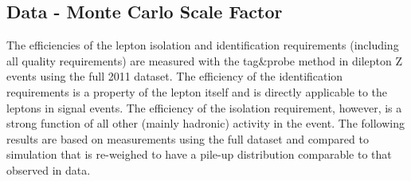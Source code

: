 \subsection{Data - Monte Carlo Scale Factor}
\label{sec:tnp}

The efficiencies of the lepton isolation and identification requirements (including all quality requirements) 
are measured with the tag\&probe method in dilepton Z events using the full 2011 dataset.
The efficiency of the identification requirements is a property of the lepton itself and is directly applicable
 to the leptons in signal events.
The efficiency of the isolation requirement, however, is a strong function of all other (mainly hadronic)
activity in the event.
The following results are based on measurements using the full dataset and compared 
to simulation that is re-weighed to have a pile-up distribution comparable to that observed in data.


